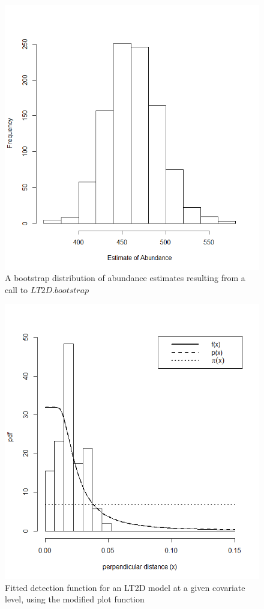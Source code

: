 \documentclass[11pt]{article}
\begin{document}
\begin{multicols}{2}
\begin{figure}[H]
\center
\includegraphics[scale=0.57]{boothist}
\caption{A bootstrap distribution of abundance estimates resulting from a call to $LT2D.bootstrap$}
\end{figure}


\begin{figure}[H]
\center
\includegraphics[scale=0.57]{covarplot1}
\caption{Fitted detection function for an LT2D model at a given covariate level, using the modified plot function}
\end{figure}



\end{multicols}
\end{document}
